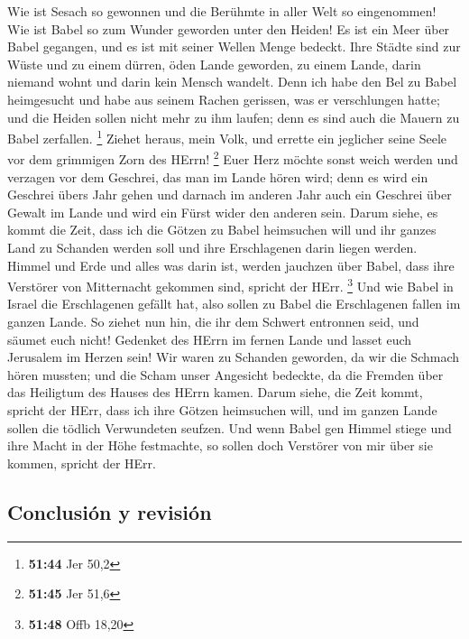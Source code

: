  Wie ist Sesach so gewonnen und die Berühmte in aller
Welt so eingenommen! Wie ist Babel so zum Wunder geworden unter den
Heiden!  Es ist ein Meer über Babel gegangen, und es ist
mit seiner Wellen Menge bedeckt.  Ihre Städte sind zur
Wüste und zu einem dürren, öden Lande geworden, zu einem Lande, darin
niemand wohnt und darin kein Mensch wandelt.  Denn ich
habe den Bel zu Babel heimgesucht und habe aus seinem Rachen gerissen,
was er verschlungen hatte; und die Heiden sollen nicht mehr zu ihm
laufen; denn es sind auch die Mauern zu Babel zerfallen. \footnote{\textbf{51:44}
  Jer 50,2}  Ziehet heraus, mein Volk, und errette ein
jeglicher seine Seele vor dem grimmigen Zorn des HErrn! \footnote{\textbf{51:45}
  Jer 51,6}  Euer Herz möchte sonst weich werden und
verzagen vor dem Geschrei, das man im Lande hören wird; denn es wird ein
Geschrei übers Jahr gehen und darnach im anderen Jahr auch ein Geschrei
über Gewalt im Lande und wird ein Fürst wider den anderen sein.
 Darum siehe, es kommt die Zeit, dass ich die Götzen zu
Babel heimsuchen will und ihr ganzes Land zu Schanden werden soll und
ihre Erschlagenen darin liegen werden.  Himmel und Erde
und alles was darin ist, werden jauchzen über Babel, dass ihre Verstörer
von Mitternacht gekommen sind, spricht der HErr. \footnote{\textbf{51:48}
  Offb 18,20}  Und wie Babel in Israel die Erschlagenen
gefällt hat, also sollen zu Babel die Erschlagenen fallen im ganzen
Lande.  So ziehet nun hin, die ihr dem Schwert entronnen
seid, und säumet euch nicht! Gedenket des HErrn im fernen Lande und
lasset euch Jerusalem im Herzen sein!  Wir waren zu
Schanden geworden, da wir die Schmach hören mussten; und die Scham unser
Angesicht bedeckte, da die Fremden über das Heiligtum des Hauses des
HErrn kamen.  Darum siehe, die Zeit kommt, spricht der
HErr, dass ich ihre Götzen heimsuchen will, und im ganzen Lande sollen
die tödlich Verwundeten seufzen.  Und wenn Babel gen
Himmel stiege und ihre Macht in der Höhe festmachte, so sollen doch
Verstörer von mir über sie kommen, spricht der HErr.

\hypertarget{conclusiuxf3n-y-revisiuxf3n}{%
\subsection{Conclusión y revisión}\label{conclusiuxf3n-y-revisiuxf3n}}

